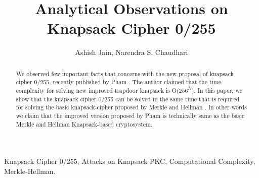 \documentclass[5p,times,twocolumn]{elsarticle}
\begin{document}
\begin{frontmatter}



\title{Analytical Observations on Knapsack Cipher 0/255}
\author{Ashish Jain, Narendra S. Chaudhari}
\address{Department of Computer Science and Engineering, Indian Institute of Technology Indore, India}


\begin{abstract}
We observed few important facts that concerns with the new proposal of knapsack cipher 0/255, recently published by Pham \cite{pham2011improvement}. The author claimed that the time complexity for solving new improved trapdoor knapsack is O(${256}^{N}$). In this paper, we show that the knapsack cipher 0/255 can be solved in the same time that is required  for solving the basic knapsack-cipher proposed by Merkle and Hellman \cite{merkle1978hiding}. In other words we claim that the improved version proposed by Pham \cite{pham2011improvement} is technically same as the basic Merkle and Hellman Knapsack-based cryptosystem.
\end{abstract}

\begin{keyword}
\label{abstract}
Knapsack Cipher 0/255, Attacks on Knapsack PKC, Computational Complexity, Merkle-Hellman.
\end{keyword}

\end{frontmatter}
\end{document}
